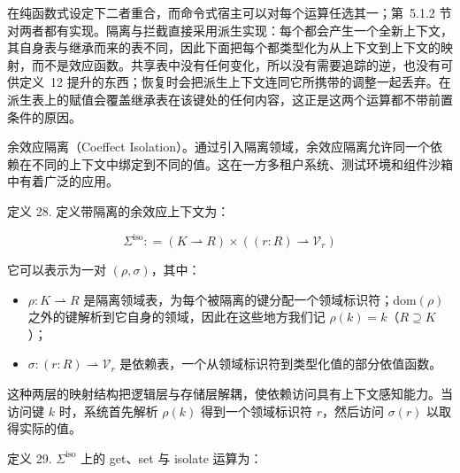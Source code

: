 \documentclass[
  10
]{article}
\begin{document}
在纯函数式设定下二者重合，而命令式宿主可以对每个运算任选其一；第~5.1.2 节对两者都有实现。隔离与拦截直接采用派生实现：每个都会产生一个全新上下文，其自身表与继承而来的表不同，因此下面把每个都类型化为从上下文到上下文的映射，而不是效应函数。共享表中没有任何变化，所以没有需要追踪的逆，也没有可供定义~12 提升的东西；恢复时会把派生上下文连同它所携带的调整一起丢弃。在派生表上的赋值会覆盖继承表在该键处的任何内容，这正是这两个运算都不带前置条件的原因。

余效应隔离（Coeffect Isolation）。通过引入隔离领域，余效应隔离允许同一个依赖在不同的上下文中绑定到不同的值。这在一方多租户系统、测试环境和组件沙箱中有着广泛的应用。

定义 28. 定义带隔离的余效应上下文为：

\[
\Sigma ^ { \mathrm { i s o } } : = ( K \rightharpoonup R ) \times ( ( r : R ) \rightharpoonup \mathcal { V } _ { r } )\tag{27}
\]

它可以表示为一对 \(( \rho , \sigma )\)，其中：

\begin{itemize}
\item \(\rho : K \rightharpoonup R\) 是隔离领域表，为每个被隔离的键分配一个领域标识符；dom\(( \rho )\) 之外的键解析到它自身的领域，因此在这些地方我们记 \(\rho ( k ) = k\)（\(R \supseteq K\)）；
\item \(\sigma : ( r : R ) \rightharpoonup \mathcal { V } _ { r }\) 是依赖表，一个从领域标识符到类型化值的部分依值函数。
\end{itemize}

这种两层的映射结构把逻辑层与存储层解耦，使依赖访问具有上下文感知能力。当访问键 \(k\) 时，系统首先解析 \(\rho ( k )\) 得到一个领域标识符 \(r\)，然后访问 \(\sigma ( r )\) 以取得实际的值。

定义 29. \(\Sigma ^ { \mathrm { i s o } }\) 上的 get、set 与 isolate 运算为：
\end{document}
